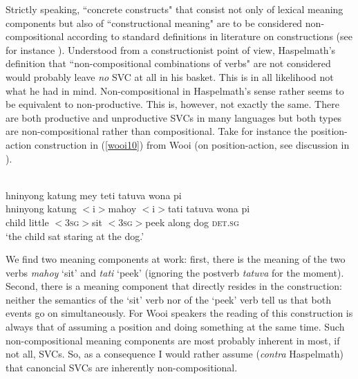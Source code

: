 Strictly speaking, ``concrete constructs" that consist not only of lexical meaning components but also of ``constructional meaning" are to be considered non-compositional according to standard definitions in literature on constructions (see for instance \citealt{goldberg1995constructions, goldberg2006constructions, croft2001radical}). Understood from a constructionist point of view, Haspelmath's definition that ``non-compositional combinations of verbs" are not considered would probably leave \emph{no} SVC at all in his basket. This is in all likelihood not what he had in mind. Non-compositional in Haspelmath's sense rather seems to be equivalent to non-productive. This is, however, not exactly the same. There are both productive and unproductive SVCs in many languages but both types are non-compositional rather than compositional. Take for instance the position-action construction in (\ref{wooi10}) from Wooi (on position-action, see discussion in ).

\ea \label{wooi10}
\\
\glll hninyong katung mey teti tatuva wona pi \\
hninyong katung $<$i$>$mahoy $<$i$>$tati tatuva wona pi \\
 child little $<$\textsc{3}\textsc{sg}$>$sit $<$\textsc{3}\textsc{sg}$>$peek along dog \textsc{det}.\textsc{sg} \\
\glft `the child sat staring at the dog.'\\ 
\z

We find two meaning components at work: first, there is the meaning of the two verbs \textit{mahoy} `sit' and \textit{tati} `peek' (ignoring the postverb \textit{tatuva} for the moment). Second, there is a meaning component that directly resides in the construction: neither the semantics of the `sit' verb nor of the `peek' verb tell us that both events go on simultaneously. For Wooi speakers the reading of this construction is always that of assuming a position and doing something at the same time. Such non-compositional meaning components are most probably inherent in most, if not all, SVCs. So, as a consequence I would rather assume (\textit{contra} Haspelmath) that canoncial SVCs are inherently non-compositional.

